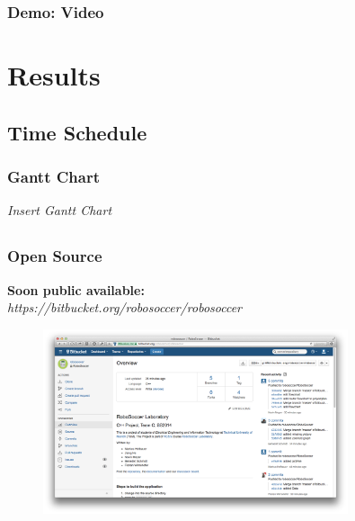 \documentclass[hyperref={pdfpagelabels=false},compress]{beamer}
\begin{document}
\begin{frame}
    \frametitle{Demo: Video}
	\centering
\end{frame}

\section{Results}
\subsection{Time Schedule}
\begin{frame}
    \frametitle{Gantt Chart}
	\textit{Insert Gantt Chart}
\end{frame}

\subsection{}
\begin{frame}
    \frametitle{Open Source}
    \textbf{Soon public available:}\\
    \textit{https://bitbucket.org/robosoccer/robosoccer}
    \begin{center}
        \begin{figure}
            \includegraphics[width=0.8\textwidth]{bucket.png}
        \end{figure}
    \end{center}
\end{frame}
\end{document}
